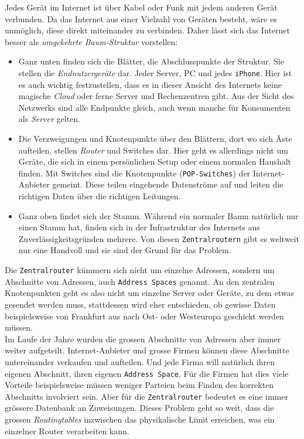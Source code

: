 \documentclass[11pt]{article}
\begin{document}
\noindent Jedes Gerät im Internet ist über Kabel oder Funk mit jedem
anderen Gerät verbunden. Da das Internet aus einer Vielzahl von
Geräten besteht, wäre es unmöglich, diese direkt miteinander zu
verbinden. Daher lässt sich das Internet besser als \emph{umgekehrte
Baum-Struktur} vorstellen:
\begin{itemize}
\item Ganz unten finden sich die Blätter, die Abschlusspunkte der
Struktur. Sie stellen die \emph{Endnutzergeräte} dar. Jeder Server, PC und
jedes \texttt{iPhone}. Hier ist es auch wichtig festzustellen, dass es in
dieser Ansicht des Internets keine magische \emph{Cloud} oder ferne Server
und Rechenzentren gibt. Aus der Sicht des Netzwerks sind alle
Endpunkte gleich, auch wenn manche für Konsumenten als \emph{Server}
gelten.
\item Die Verzweigungen und Knotenpunkte über den Blättern, dort wo sich
Äste aufteilen, stellen \emph{Router} und Switches dar. Hier geht es
allerdings nicht um Geräte, die sich in einem persönlichen Setup
oder einem normalen Haushalt finden. Mit Switches sind die
Knotenpunkte (\texttt{POP-Switches}) der Internet-Anbieter gemeint. Diese
teilen eingehende Datenströme auf und leiten die richtigen Daten
über die richtigen Leitungen.
\item Ganz oben findet sich der Stamm. Während ein normaler Baum natürlich
nur einen Stamm hat, finden sich in der Infrastruktur des Internets
aus Zuverlässigkeitsgründen mehrere. Von diesen \texttt{Zentralroutern} gibt
es weltweit nur eine Handvoll und sie sind der Grund für das
Problem.
\end{itemize}

\noindent Die \texttt{Zentralrouter} kümmern sich nicht um einzelne Adressen,
sondern um Abschnitte von Adressen, auch \texttt{Address Spaces} genannt. An
den zentralen Knotenpunkten geht es also nicht um einzelne Server oder
Geräte, zu dem etwas gesendet werden muss, stattdessen wird eher
entschieden, ob gewisse Daten beispielsweise von Frankfurt aus nach
Ost- oder Westeuropa geschickt werden müssen.\\

\noindent Im Laufe der Jahre wurden die grossen Abschnitte von
Adressen aber immer weiter aufgeteilt. Internet-Anbieter und grosse
Firmen können diese Abschnitte untereinander verkaufen und aufteilen.
Und jede Firma will natürlich ihren eigenen Abschnitt, ihren eigenen
\texttt{Address Space}. Für die Firmen hat dies viele Vorteile beispielsweise
müssen weniger Parteien beim Finden des korrekten Abschnitts
involviert sein. Aber für die \texttt{Zentralrouter} bedeutet es eine immer
grössere Datenbank an Zuweisungen. Dieses Problem geht so weit, dass
die grossen \emph{Routingtables} inzwischen das physikalische Limit
erreichen, was ein einzelner Router verarbeiten kann.\\
\end{document}
